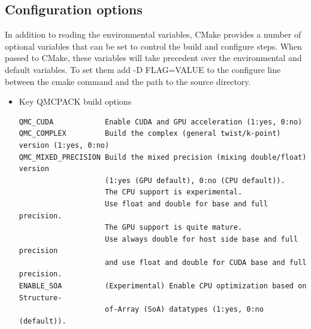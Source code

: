 \subsection{Configuration options}
\label{sec:cmakeoptions}
In addition to reading the environmental variables, CMake provides a
number of optional variables that can be set to control the build and
configure steps.  When passed to CMake, these variables will take
precedent over the environmental and default variables.  To set them
add -D FLAG=VALUE to the configure line between the cmake command and
the path to the source directory.

\begin{itemize}
\item  Key QMCPACK build options
\begin{verbatim}
QMC_CUDA            Enable CUDA and GPU acceleration (1:yes, 0:no)
QMC_COMPLEX         Build the complex (general twist/k-point) version (1:yes, 0:no)
QMC_MIXED_PRECISION Build the mixed precision (mixing double/float) version
                    (1:yes (GPU default), 0:no (CPU default)).
                    The CPU support is experimental.
                    Use float and double for base and full precision.
                    The GPU support is quite mature.
                    Use always double for host side base and full precision
                    and use float and double for CUDA base and full precision.
ENABLE_SOA          (Experimental) Enable CPU optimization based on Structure-
                    of-Array (SoA) datatypes (1:yes, 0:no (default)).


\end{verbatim}
\end{itemize}
